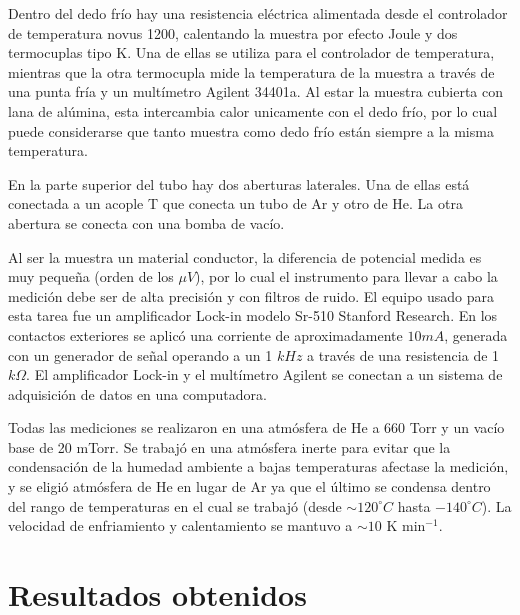 \documentclass[12pt]{article}
\theoremstyle{definition}
\theoremstyle{remark}
\begin{document}
{Dentro del dedo frío hay una resistencia eléctrica alimentada desde el controlador de temperatura novus 1200, calentando la muestra por efecto Joule y dos termocuplas tipo K. Una de ellas se utiliza para el controlador de temperatura, mientras que la otra termocupla mide la temperatura de la muestra a través de una punta fría y un multímetro Agilent 34401a. Al estar la muestra cubierta con lana de alúmina, esta intercambia calor unicamente con el dedo frío, por lo cual puede considerarse que tanto muestra como dedo frío están siempre a la misma temperatura.

En la parte superior del tubo hay dos aberturas laterales. Una de ellas está conectada a un acople T que conecta un tubo de Ar y otro de He. La otra abertura se conecta con una bomba de vacío.

Al ser la muestra un material conductor, la diferencia de potencial medida es muy pequeña (orden de los $\mu V$), por lo cual el instrumento para llevar a cabo la medición debe ser de alta precisión y con filtros de ruido. El equipo usado para esta tarea fue un amplificador Lock-in modelo Sr-510 Stanford Research. En los contactos exteriores se aplicó una corriente de aproximadamente $10mA$, generada con un generador de señal operando a un 1 $kHz$ a través de una resistencia de 1$k\Omega$. El amplificador Lock-in y el multímetro Agilent se conectan a un sistema de adquisición de datos en una computadora. 

Todas las mediciones se realizaron en una atmósfera de He a 660 Torr y un vacío base de 20 mTorr. Se trabajó en una atmósfera inerte para evitar que la condensación de la humedad ambiente a bajas temperaturas afectase la medición, y se eligió atmósfera de He en lugar de Ar ya que el último se condensa dentro del rango de temperaturas en el cual se trabajó (desde $\sim 120 ^\circ C$ hasta $-140 ^\circ C$). La velocidad de enfriamiento y calentamiento se mantuvo a $\sim10$ K min$^{-1}$.

\newpage
\section{Resultados obtenidos}

}
\end{document}
